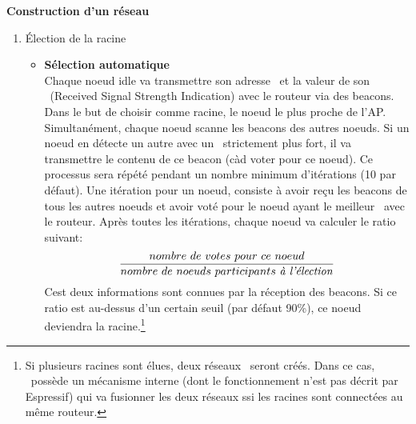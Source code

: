         \textbf{Construction d'un réseau}
        \newline
        \begin{enumerate}
            \item \'Election de la racine
                \begin{itemize}
                    \item \textbf{Sélection automatique}\\
                        Chaque noeud idle va transmettre son adresse \mac\ et
                        la valeur de son \rssi\ (Received Signal Strength Indication) avec le routeur via des beacons.
                        Dans le but de choisir comme racine, le noeud le plus proche de l'AP.
                        Simultanément, chaque noeud scanne les beacons des autres noeuds. Si un noeud
                        en détecte un autre avec un \rssi\ strictement plus fort, il va transmettre le contenu de
                        ce beacon (càd voter pour ce noeud).
                        Ce processus sera répété pendant un nombre minimum d'itérations (10 par défaut).
                        Une itération pour un noeud, consiste à avoir reçu les beacons de tous les autres noeuds
                        et avoir voté pour le noeud ayant le meilleur \rssi\ avec le routeur.
                        Après toutes les itérations, chaque noeud va calculer le ratio suivant: 
                        \[\frac{nombre\ de\ votes\ pour\ ce\ noeud}{nombre\ de\ noeuds\ participants\ \textrm{\textit{à l'élection}}}\]
                        Cest deux informations sont connues par la réception des beacons.
                        Si ce ratio est au-dessus d'un certain seuil (par défaut 90\%), ce noeud deviendra la racine.\footnote{
                            Si plusieurs racines sont élues, deux réseaux \espmesh\ seront créés.
                            Dans ce cas, \espmesh\ possède un mécanisme interne (dont le fonctionnement n'est pas décrit par Espressif) qui va fusionner les deux réseaux
                            ssi les racines sont connectées au même routeur.
                        }




\end{itemize}
\end{enumerate}
